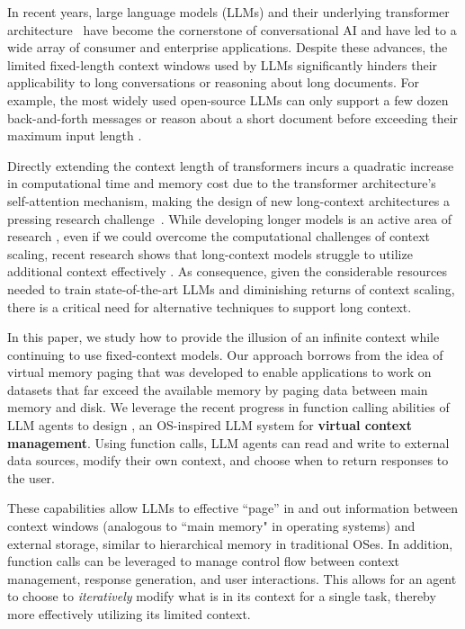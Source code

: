 
In recent years, large language models (LLMs) and their underlying transformer architecture~\citep{vaswani2017attention,devlin2018bert,brown2020language,ouyang2022instructgpt} have become the cornerstone of conversational AI and have led to a wide array of consumer and enterprise applications. Despite these advances, the limited fixed-length context windows used by LLMs significantly hinders their applicability to long conversations or reasoning about long documents.
For example, the most widely used open-source LLMs can only support a few dozen back-and-forth messages or 
reason about a short document 
before exceeding their maximum input length \citep{touvron2023llama2}.

Directly extending the context length of transformers incurs a quadratic increase in computational time and memory cost due to the transformer architecture's self-attention mechanism, making the design of new long-context architectures a pressing research challenge~\citep{dai2019transformerxl,kitaev2020reformer,beltagy2020longformer}. 
While developing longer models is an active area of research \citep{dong2023longcontextsurvey}, 
even if we could overcome the computational challenges of context scaling, recent research shows that long-context models struggle to utilize additional context effectively \citep{liu2023lostinmiddle}.
As consequence, given the considerable resources needed to train state-of-the-art LLMs and diminishing returns of context scaling, there is a critical need for alternative techniques to support long context. 












In this paper, we study how to provide the illusion of an infinite context while continuing to use fixed-context models.
Our approach borrows from the idea of virtual memory paging that was developed to enable applications to work on datasets that far exceed the available memory by paging data between main memory and disk.
We leverage the recent progress in function calling abilities of LLM agents \citep{schick2023toolformer,liu2023agentbench} to design \ours, an OS-inspired LLM system for \textbf{virtual context management}.
Using function calls, LLM agents can read and write to external data sources, modify their own context, and choose when to return responses to the user. 


These capabilities allow LLMs to effective  ``page'' in and out information between context windows (analogous to ``main memory" in operating systems) and external storage, similar to hierarchical memory in traditional OSes. 
In addition, function calls can be leveraged to manage control flow between context management, response generation, and user interactions. This allows for an agent to choose to \textit{iteratively} modify what is in its context for a single task, thereby more effectively utilizing its limited context. 









